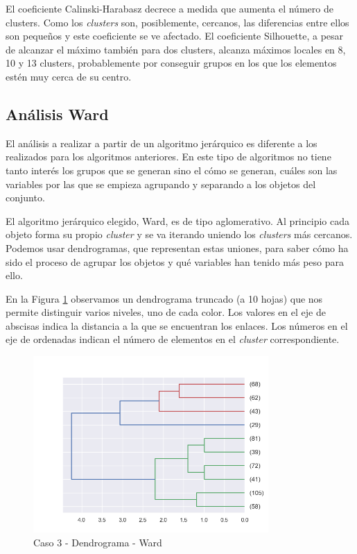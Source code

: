 \documentclass[a4paper, 20pt]{article}
\begin{document}
El coeficiente Calinski-Harabasz decrece a medida que aumenta el número de clusters. Como los \textit{clusters} son, posiblemente, cercanos, las diferencias entre ellos son pequeños y este coeficiente se ve afectado. El coeficiente Silhouette, a pesar de alcanzar el máximo también para dos clusters, alcanza máximos locales en 8, 10 y 13 clusters, probablemente por conseguir grupos en los que los elementos estén muy cerca de su centro.

\subsection{Análisis Ward}

El análisis a realizar a partir de un algoritmo jerárquico es diferente a los realizados para los algoritmos anteriores. En este tipo de algoritmos no tiene tanto interés los grupos que se generan sino el cómo se generan, cuáles son las variables por las que se empieza agrupando y separando a los objetos del conjunto.

El algoritmo jerárquico elegido, Ward, es de tipo aglomerativo. Al principio cada objeto forma su propio \textit{cluster} y se va iterando uniendo los \textit{clusters} más cercanos. Podemos usar dendrogramas, que representan estas uniones, para saber cómo ha sido el proceso de agrupar los objetos y qué variables han tenido más peso para ello.

En la Figura \ref{fig:ward_dendro3} observamos un dendrograma truncado (a 10 hojas) que nos permite distinguir varios niveles, uno de cada color. Los valores en el eje de abscisas indica la distancia a la que se encuentran los enlaces. Los números en el eje de ordenadas indican el número de elementos en el \textit{cluster} correspondiente.

\begin{figure}[H]
    \centering
    \includegraphics[width=0.8\textwidth]{./caso3/Ward_dendrograma3}
    \caption{Caso 3 - Dendrograma - Ward}
    \label{fig:ward_dendro3}
\end{figure}
\end{document}
